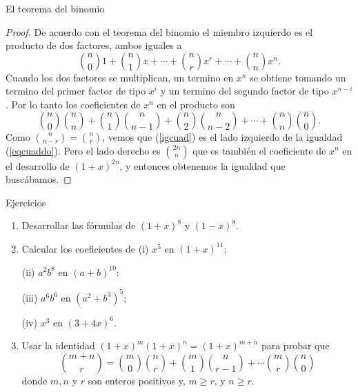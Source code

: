\documentclass[11pt,spanish,makeidx]{amsbook}
\theoremstyle{definition}
\theoremstyle{remark}
\begin{document}
\begin{section}{El teorema del binomio}
\begin{proof}
De acuerdo con el teorema del binomio el miembro izquierdo es el producto de dos factores, ambos iguales a
$$
\binom{n}{0}1+\binom{n}{1}x+\cdots+\binom{n}{r}x^r+\cdots+\binom{n}{n}x^n.
$$
 Cuando los dos factores se multiplican, un termino en $x^n$ se obtiene tomando un termino del primer factor de tipo $x^i$ y un termino del segundo factor de tipo $x^{n-i}$. Por lo tanto los coeficientes de $x^n$ en el producto son
\begin{equation}\label{igcuad}
\binom{n}{0}\binom{n}{n}+\binom{n}{1}\binom{n}{n-1}+\binom{n}{2}\binom{n}{n-2}+\cdots
+\binom{n}{n}\binom{n}{0}.
\end{equation}
Como $\binom{n}{n-r}=\binom{n}{r}$, vemos que (\ref{igcuad}) es el lado izquierdo de la igualdad (\ref{eqcuaddo}). Pero el lado derecho es $\binom{2n}{n}$ que es también el coeficiente de $x^n$ en el desarrollo de $(1+x)^{2n}$, y entonces obtenemos la igualdad que buscábamos.
\end{proof}

\begin{subsection}{Ejercicios}\label{ej3.6.1}
\begin{enumerate}
\item Desarrollar las fórmulas de $(1+x)^8$ y $(1-x)^8$.
\item Calcular los coeficientes de
(i) $x^5$ en $(1+x)^{11}$;

(ii) $a^2b^8 $ en $(a+b)^{10}$;

(iii) $a^6 b^6$ en $(a^2 +b^3)^5$;

(iv) $x^3$ en $(3+4x)^6$.

\item Usar la identidad $(1+x)^m(1+x)^n=(1+x)^{m+n}$ para probar que
$$
\binom{m+n}{r} =
\binom{m}{0}\binom{n}{r}+\binom{m}{1}\binom{n}{r-1}+\cdots
\binom{m}{r}\binom{n}{0}
$$
donde $m,n$ y $r$ son enteros positivos y, $m\ge r$, y $n \ge r$.
\end{enumerate}
\end{subsection}

\end{section}
\end{document}
